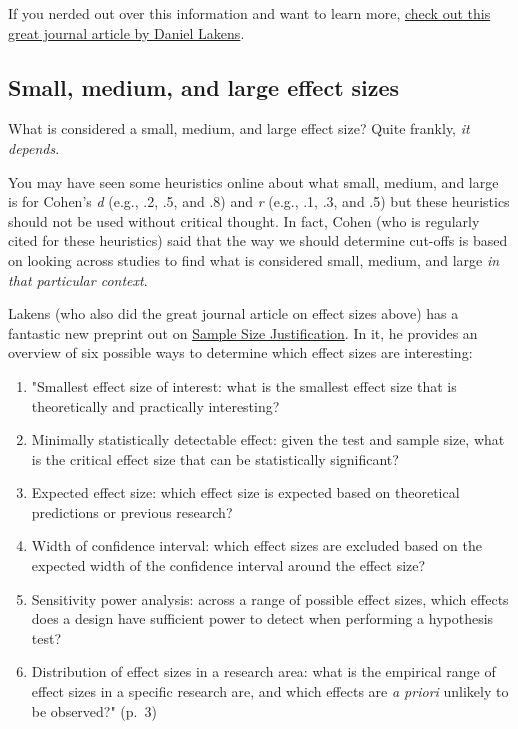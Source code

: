 \documentclass[
]{book}
\providecommand{\tightlist}{%
  \setlength{\itemsep}{0pt}\setlength{\parskip}{0pt}}
\begin{document}
If you nerded out over this information and want to learn more, \href{https://www.frontiersin.org/articles/10.3389/fpsyg.2013.00863/full}{check out this great journal article by Daniel Lakens}.

\hypertarget{small-medium-and-large-effect-sizes}{%
\subsection{Small, medium, and large effect sizes}\label{small-medium-and-large-effect-sizes}}

What is considered a small, medium, and large effect size? Quite frankly, \emph{it depends}.

You may have seen some heuristics online about what small, medium, and large is for Cohen's \emph{d} (e.g., .2, .5, and .8) and \emph{r} (e.g., .1, .3, and .5) but these heuristics should not be used without critical thought. In fact, Cohen (who is regularly cited for these heuristics) said that the way we should determine cut-offs is based on looking across studies to find what is considered small, medium, and large \emph{in that particular context}.

Lakens (who also did the great journal article on effect sizes above) has a fantastic new preprint out on \href{https://psyarxiv.com/9d3yf/}{Sample Size Justification}. In it, he provides an overview of six possible ways to determine which effect sizes are interesting:

\begin{enumerate}
\def\labelenumi{\arabic{enumi}.}
\tightlist
\item
  "Smallest effect size of interest: what is the smallest effect size that is theoretically and practically interesting?
\item
  Minimally statistically detectable effect: given the test and sample size, what is the critical effect size that can be statistically significant?
\item
  Expected effect size: which effect size is expected based on theoretical predictions or previous research?
\item
  Width of confidence interval: which effect sizes are excluded based on the expected width of the confidence interval around the effect size?
\item
  Sensitivity power analysis: across a range of possible effect sizes, which effects does a design have sufficient power to detect when performing a hypothesis test?
\item
  Distribution of effect sizes in a research area: what is the empirical range of effect sizes in a specific research are, and which effects are \emph{a priori} unlikely to be observed?" (p.~3)
\end{enumerate}
\end{document}
